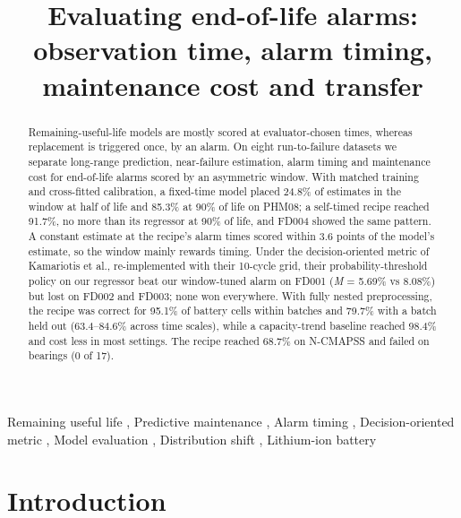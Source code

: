 \documentclass[a4paper,fleqn,doubleblind]{cas-dc}
\begin{document}
\let\WriteBookmarks\relax
\let\printorcid\relax
\def\floatpagepagefraction{1}
\def\textpagefraction{.001}
\title [mode = title]{Evaluating end-of-life alarms: observation time, alarm timing, maintenance cost and transfer}
\begin{abstract}
Remaining-useful-life models are mostly scored at evaluator-chosen times, whereas replacement is triggered once, by an alarm. On eight run-to-failure datasets we separate long-range prediction, near-failure estimation, alarm timing and maintenance cost for end-of-life alarms scored by an asymmetric window. With matched training and cross-fitted calibration, a fixed-time model placed 24.8\% of estimates in the window at half of life and 85.3\% at 90\% of life on PHM08; a self-timed recipe reached 91.7\%, no more than its regressor at 90\% of life, and FD004 showed the same pattern. A constant estimate at the recipe's alarm times scored within 3.6 points of the model's estimate, so the window mainly rewards timing. Under the decision-oriented metric of Kamariotis et al., re-implemented with their 10-cycle grid, their probability-threshold policy on our regressor beat our window-tuned alarm on FD001 (\textit{M} = 5.69\% vs 8.08\%) but lost on FD002 and FD003; none won everywhere. With fully nested preprocessing, the recipe was correct for 95.1\% of battery cells within batches and 79.7\% with a batch held out (63.4--84.6\% across time scales), while a capacity-trend baseline reached 98.4\% and cost less in most settings. The recipe reached 68.7\% on N-CMAPSS and failed on bearings (0 of 17).
\end{abstract}
\begin{keywords}
Remaining useful life \sep
Predictive maintenance \sep
Alarm timing \sep
Decision-oriented metric \sep
Model evaluation \sep
Distribution shift \sep
Lithium-ion battery
\end{keywords}
\maketitle
\linenumbers
\section{Introduction}\label{sec:1}
\end{document}
